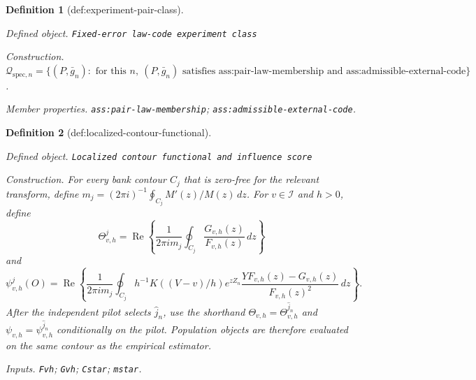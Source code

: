 \documentclass{article}
\newtheorem{definition}{Definition}
\begin{document}
\begin{definition}[def:experiment-pair-class]\label{def:experiment-pair-class}
\par\smallskip\noindent\emph{Defined object.} \texttt{Fixed-\allowbreak{}error law-\allowbreak{}code experiment class}
\par\smallskip\noindent\emph{Construction.} \(\mathcal Q_{\mathrm{spec},n}=\{(P,\bar g_n):\text{ for this }n,\ (P,\bar g_n)\text{ satisfies }\text{ass:pair-law-membership}\text{ and }\text{ass:admissible-external-code}\}\).
\par\smallskip\noindent\emph{Member properties.} \texttt{ass:\allowbreak{}pair-\allowbreak{}law-\allowbreak{}membership}; \texttt{ass:\allowbreak{}admissible-\allowbreak{}external-\allowbreak{}code}.
\end{definition}

\begin{definition}[def:localized-contour-functional]\label{def:localized-contour-functional}
\par\smallskip\noindent\emph{Defined object.} \texttt{Localized contour functional and influence score}
\par\smallskip\noindent\emph{Construction.} For every bank contour \(C_j\) that is zero-free for the relevant transform, define \(m_j=(2\pi i)^{-1}\oint_{C_j}M'(z)/M(z)\,dz\).  For \(v\in\mathcal I\) and \(h>0\), define
\[
 \Theta^{j}_{v,h}=\operatorname{Re}\left\{\frac{1}{2\pi i m_j}\oint_{C_j}\frac{G_{v,h}(z)}{F_{v,h}(z)}\,dz\right\}
\]
and
\[
 \psi^{j}_{v,h}(O)=\operatorname{Re}\left\{\frac{1}{2\pi i m_j}\oint_{C_j}h^{-1}K((V-v)/h)e^{zZ_n}\frac{YF_{v,h}(z)-G_{v,h}(z)}{F_{v,h}(z)^2}\,dz\right\}.
\]
After the independent pilot selects \(\widehat j_n\), use the shorthand \(\Theta_{v,h}=\Theta^{\widehat j_n}_{v,h}\) and \(\psi_{v,h}=\psi^{\widehat j_n}_{v,h}\) conditionally on the pilot.  Population objects are therefore evaluated on the same contour as the empirical estimator.
\par\smallskip\noindent\emph{Inputs.} \texttt{Fvh}; \texttt{Gvh}; \texttt{Cstar}; \texttt{mstar}.
\end{definition}
\end{document}
